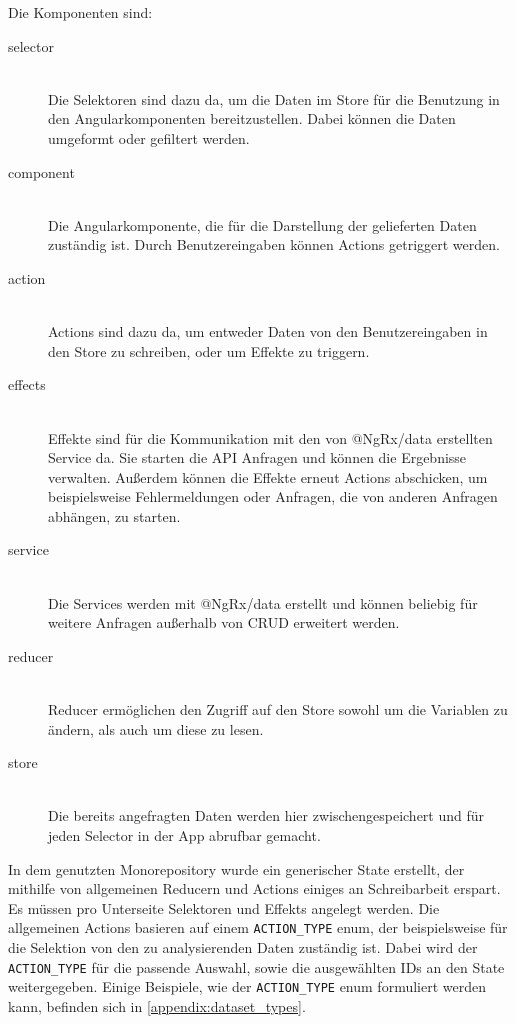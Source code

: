 Die Komponenten sind:
\begin{description}
    \item[selector]\hfill \\
    Die Selektoren sind dazu da, um die Daten im Store für die Benutzung in den Angularkomponenten bereitzustellen. Dabei können die Daten umgeformt oder gefiltert werden.
    \item[component]\hfill \\
    Die Angularkomponente, die für die Darstellung der gelieferten Daten zuständig ist. Durch Benutzereingaben können Actions getriggert werden.
    \item[action]\hfill \\
    Actions sind dazu da, um entweder Daten von den Benutzereingaben in den Store zu schreiben, oder um Effekte zu triggern. 
    \item[effects]\hfill \\
    Effekte sind für die Kommunikation mit den von @NgRx/data erstellten Service da. Sie starten die API Anfragen und können die Ergebnisse verwalten. Außerdem können die Effekte erneut Actions abschicken, um beispielsweise Fehlermeldungen oder Anfragen, die von anderen Anfragen abhängen, zu starten.
    \item[service]\hfill \\
    Die Services werden mit @NgRx/data erstellt und können beliebig für weitere Anfragen außerhalb von CRUD erweitert werden.
    \item[reducer]\hfill \\
    Reducer ermöglichen den Zugriff auf den Store sowohl um die Variablen zu ändern, als auch um diese zu lesen. 
    \item[store]\hfill \\
    Die bereits angefragten Daten werden hier zwischengespeichert und für jeden Selector in der App abrufbar gemacht.
\end{description}
In dem genutzten Monorepository wurde ein generischer State erstellt, der mithilfe von allgemeinen Reducern und Actions einiges an Schreibarbeit erspart. Es müssen pro Unterseite Selektoren und Effekts angelegt werden. Die allgemeinen Actions basieren auf einem \texttt{ACTION\_TYPE} enum, der beispielsweise für die Selektion von den zu analysierenden Daten zuständig ist. Dabei wird der \texttt{ACTION\_TYPE} für die passende Auswahl, sowie die ausgewählten IDs an den State weitergegeben. Einige Beispiele, wie der \texttt{ACTION\_TYPE} enum formuliert werden kann, befinden sich in \ref{appendix:dataset_types}. 
